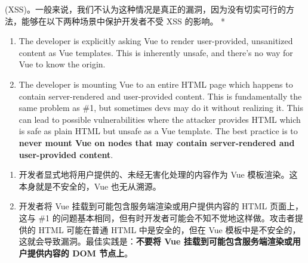 \begin{paracol}{2}
(XSS)。一般来说，我们不认为这种情况是真正的漏洞，因为没有切实可行的方法，能够在以下两种场景中保护开发者不受
XSS 的影响。
\switchcolumn[0]*%
\begin{enumerate}
\item
  The developer is explicitly asking Vue to render user-provided,
  unsanitized content as Vue templates. This is inherently unsafe, and
  there's no way for Vue to know the origin.
\item
  The developer is mounting Vue to an entire HTML page which happens to
  contain server-rendered and user-provided content. This is
  fundamentally the same problem as \#1, but sometimes devs may do it
  without realizing it. This can lead to possible vulnerabilities where
  the attacker provides HTML which is safe as plain HTML but unsafe as a
  Vue template. The best practice is to \textbf{never mount Vue on nodes
  that may contain server-rendered and user-provided content}.
\end{enumerate}
\switchcolumn
\begin{enumerate}
\item
  开发者显式地将用户提供的、未经无害化处理的内容作为 Vue
  模板渲染。这本身就是不安全的，Vue 也无从溯源。
\item
  开发者将 Vue 挂载到可能包含服务端渲染或用户提供内容的 HTML
  页面上，这与 \#1
  的问题基本相同，但有时开发者可能会不知不觉地这样做。攻击者提供的 HTML
  可能在普通 HTML 中是安全的，但在 Vue
  模板中是不安全的，这就会导致漏洞。最佳实践是：\textbf{不要将 Vue
  挂载到可能包含服务端渲染或用户提供内容的 DOM 节点上}。
\end{enumerate}
\end{paracol}



